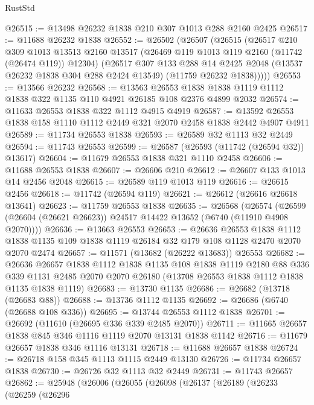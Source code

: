 \begin{lexlean}{RustStd}
\begin{coremodule}
@26515 := @13498 @26232 @1838 @210 @307 @1013 @288 @2160 @2425
@26517 := @11688 @26232 @1838
@26552 := @26502
    (@26507
      (@26515
        (@26517
          @210
          @309
          @1013
          @13513
          @2160
          @13517
          (@26469 @119 @1013 @119 @2160 (@11742 (@26474 @119)) @12304)
          (@26517
            @307
            @133
            @288
            @14
            @2425
            @2048
            (@13537 @26232 @1838 @304 @288 @2424 @13549)
            (@11759 @26232 @1838)))))
@26553 := @13566 @26232
@26568 := @13563
    @26553
    @1838
    @1838
    @1119
    @1112
    @1838
    @322
    @1135
    @110
    @4921
    @26185
    @108
    @2376
    @4899
    @2032
@26574 := @11633 @26553 @1838 @322 @1112 @4915 @4919
@26587 := @13592 @26553 @1838 @158 @1110 @1112 @2449 @321 @2070 @2458 @1838 @2442 @4907 @4911
@26589 := @11734 @26553 @1838
@26593 := @26589 @32 @1113 @32 @2449
@26594 := @11743 @26553
@26599 := @26587 (@26593 (@11742 (@26594 @32)) @13617)
@26604 := @11679 @26553 @1838 @321 @1110 @2458
@26606 := @11688 @26553 @1838
@26607 := @26606 @210
@26612 := @26607 @133 @1013 @14 @2456 @2048
@26615 := @26589 @119 @1013 @119
@26616 := @26615 @2456
@26618 := @11742 (@26594 @119)
@26621 := @26612 (@26616 @26618 @13641)
@26623 := @11759 @26553 @1838
@26635 := @26568
    (@26574 (@26599 (@26604 (@26621 @26623)) @24517 @14422 @13652 (@6740 (@11910 @4908 @2070))))
@26636 := @13663 @26553
@26653 := @26636
    @26553
    @1838
    @1112
    @1838
    @1135
    @109
    @1838
    @1119
    @26184
    @32
    @179
    @108
    @1128
    @2470
    @2070
    @2070
    @2474
@26657 := @11571 (@13682 (@26222 @13683)) @26553
@26682 := @26636
    @26657
    @1838
    @1112
    @1838
    @1135
    @108
    @1838
    @1119
    @2180
    @88
    @336
    @339
    @1131
    @2485
    @2070
    @2070
    @26180
    (@13708 @26553 @1838 @1112 @1838 @1135 @1838 @1119)
@26683 := @13730 @1135
@26686 := @26682 (@13718 (@26683 @88))
@26688 := @13736 @1112 @1135
@26692 := @26686 (@6740 (@26688 @108 @336))
@26695 := @13744 @26553 @1112 @1838
@26701 := @26692 (@11610 (@26695 @336 @339 @2485 @2070))
@26711 := @11665 @26657 @1838 @845 @346 @1116 @1119 @2070 @13131 @1838 @1142
@26716 := @11679 @26657 @1838 @346 @1116 @13131
@26718 := @11688 @26657 @1838
@26724 := @26718 @158 @345 @1113 @1115 @2449 @13130
@26726 := @11734 @26657 @1838
@26730 := @26726 @32 @1113 @32 @2449
@26731 := @11743 @26657
@26862 := @25948
    (@26006
      (@26055
        (@26098
          (@26137
            (@26189
              (@26233
                (@26259
                  (@26296

\end{coremodule}
\end{lexlean}
